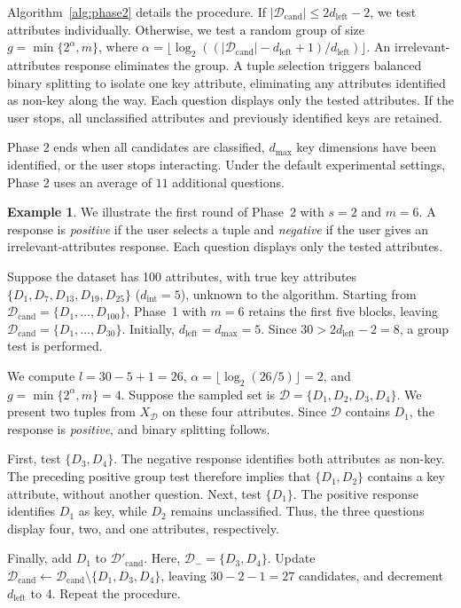 \documentclass[conference]{IEEEtran}
\theoremstyle{definition}
\newtheorem{example}[theorem]{Example}
\theoremstyle{plain}
\begin{document}
Algorithm~\ref{alg:phase2} details the procedure. If $\lvert\mathcal{D}_\text{cand}\rvert\leq2d_\text{left}-2$, we test attributes individually. Otherwise, we test a random group of size $g=\min\{2^\alpha,m\}$, where $\alpha=\lfloor\log_2((\lvert\mathcal{D}_\text{cand}\rvert-d_\text{left}+1)/d_\text{left})\rfloor$. An irrelevant-attributes response eliminates the group. A tuple selection triggers balanced binary splitting to isolate one key attribute, eliminating any attributes identified as non-key along the way. Each question displays only the tested attributes. If the user stops, all unclassified attributes and previously identified keys are retained.

Phase 2 ends when all candidates are classified, $d_\text{max}$ key dimensions have been identified, or the user stops interacting. Under the default experimental settings, Phase 2 uses an average of $11$ additional questions.

\begin{example}
{
We illustrate the first round of Phase~2 with $s=2$ and $m=6$. A response is \textit{positive} if the user selects a tuple and \textit{negative} if the user gives an irrelevant-attributes response. Each question displays only the tested attributes.\par}

Suppose the dataset has 100 attributes, with true key attributes $\{D_1,D_7,D_{13},D_{19},D_{25}\}$ ($d_\text{int}=5$), unknown to the algorithm. Starting from $\mathcal{D}_\text{cand}=\{D_1,\ldots,D_{100}\}$, Phase~1 with $m=6$ retains the first five blocks, leaving $\mathcal{D}_\text{cand}=\{D_1,\ldots,D_{30}\}$. Initially, $d_\text{left}=d_\text{max}=5$. Since $30>2d_\text{left}-2=8$, a group test is performed.

We compute $l=30-5+1=26$, $\alpha=\lfloor\log_2(26/5)\rfloor=2$, and $g=\min\{2^\alpha,m\}=4$. Suppose the sampled set is $\mathcal{D}=\{D_1,D_2,D_3,D_4\}$. We present two tuples from $X_\mathcal{D}$ on these four attributes. Since $\mathcal{D}$ contains $D_1$, the response is \textit{positive}, and binary splitting follows.

First, test $\{D_3,D_4\}$. The negative response identifies both attributes as non-key. The preceding positive group test therefore implies that $\{D_1,D_2\}$ contains a key attribute, without another question. Next, test $\{D_1\}$. The positive response identifies $D_1$ as key, while $D_2$ remains unclassified. Thus, the three questions display four, two, and one attributes, respectively.

Finally, add $D_1$ to $\mathcal{D}'_\text{cand}$. Here, $\mathcal{D}_{-}=\{D_3,D_4\}$. Update $\mathcal{D}_\text{cand}\gets\mathcal{D}_\text{cand}\setminus\{D_1,D_3,D_4\}$, leaving $30-2-1=27$ candidates, and decrement $d_\text{left}$ to 4. Repeat the procedure.
\end{example}
\end{document}
